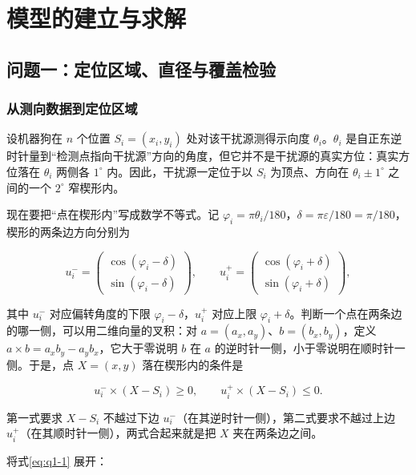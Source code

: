 \documentclass[UTF8,a4paper,zihao=5,fontset=fandol]{ctexart}
\begin{document}
\section{模型的建立与求解}\label{sec:models}


\subsection{问题一：定位区域、直径与覆盖检验}\label{sec:q1}
\subsubsection{从测向数据到定位区域}\label{sec:q1-1}

设机器狗在 $n$ 个位置 $S_i=(x_i,y_i)$ 处对该干扰源测得示向度 $\theta_i$。$\theta_i$ 是自正东逆时针量到“检测点指向干扰源”方向的角度，但它并不是干扰源的真实方位：真实方位落在 $\theta_i$ 两侧各 $1^\circ$ 内。因此，干扰源一定位于以 $S_i$ 为顶点、方向在 $\theta_i\pm1^\circ$ 之间的一个 $2^\circ$ 窄楔形内。

现在要把“点在楔形内”写成数学不等式。记 $\varphi_i=\pi\theta_i/180$，$\delta=\pi\varepsilon/180=\pi/180$，楔形的两条边方向分别为

\[
u_i^-=\begin{pmatrix}\cos(\varphi_i-\delta)\\ \sin(\varphi_i-\delta)\end{pmatrix},\qquad
u_i^+=\begin{pmatrix}\cos(\varphi_i+\delta)\\ \sin(\varphi_i+\delta)\end{pmatrix},
\]

其中 $u_i^-$ 对应偏转角度的下限 $\varphi_i-\delta$，$u_i^+$ 对应上限 $\varphi_i+\delta$。判断一个点在两条边的哪一侧，可以用二维向量的叉积：对 $a=(a_x,a_y)$、$b=(b_x,b_y)$，定义 $a\times b=a_xb_y-a_yb_x$，它大于零说明 $b$ 在 $a$ 的逆时针一侧，小于零说明在顺时针一侧。于是，点 $X=(x,y)$ 落在楔形内的条件是

\begin{equation}\label{eq:q1-1}
u_i^-\times(X-S_i)\ge 0,\qquad u_i^+\times(X-S_i)\le 0.
\end{equation}

第一式要求 $X-S_i$ 不越过下边 $u_i^-$（在其逆时针一侧），第二式要求不越过上边 $u_i^+$（在其顺时针一侧），两式合起来就是把 $X$ 夹在两条边之间。

将式\eqref{eq:q1-1} 展开：
\end{document}

